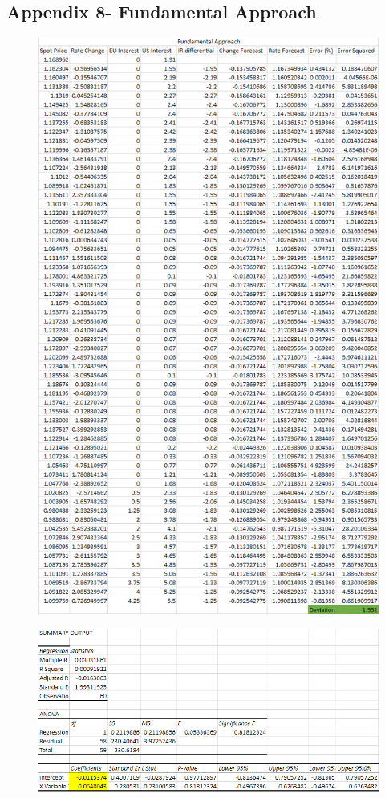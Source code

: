 \documentclass{article}
\let\Oldsubsection\subsection
\renewcommand{\subsection}{\FloatBarrier\Oldsubsection}
\begin{document}
\break

\subsection*{Appendix 8- Fundamental Approach}


\begin{figure}[h!]
    \centering
    \includegraphics[scale=0.5]{graphs/app8.png}
\end{figure}


\begin{figure}[h!]
    \centering
    \includegraphics[scale=0.5]{graphs/app8(1).png}
\end{figure}
\end{document}
